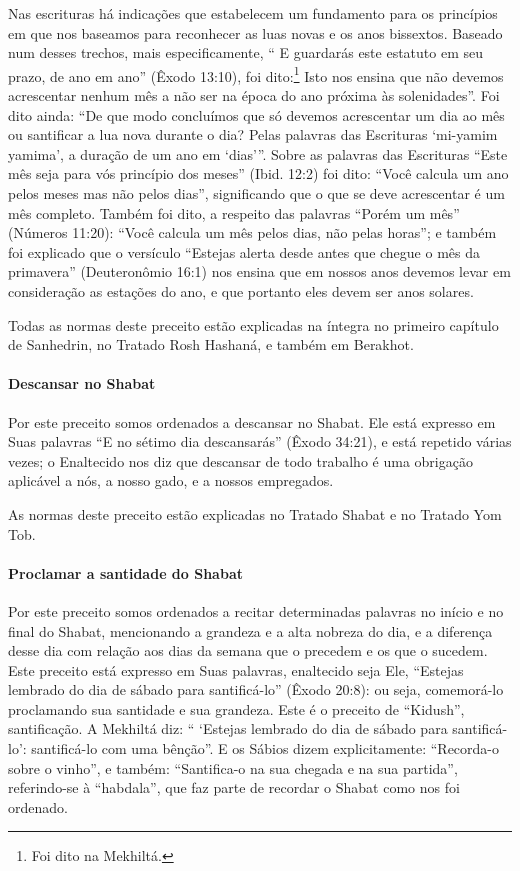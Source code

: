 Nas escrituras há indicações que estabelecem um fundamento para
os princípios em que nos baseamos para reconhecer as luas novas e os
anos bissextos. Baseado num desses trechos, mais especificamente, `` E
guardarás este estatuto em seu prazo, de ano em ano'' (Êxodo 13:10), foi
dito:\footnote{Foi dito na Mekhiltá.} Isto nos
ensina que não devemos acrescentar nenhum mês a não ser na época do ano
próxima às solenidades''. Foi dito ainda: ``De que modo concluímos que
só devemos acrescentar um dia ao mês ou santificar a lua nova durante o dia?
Pelas palavras das Escrituras `mi-yamim yamima', a duração de um ano em
`dias'''. Sobre as palavras das Escrituras ``Este mês seja para vós
princípio dos meses'' (Ibid. 12:2) foi dito: ``Você calcula um ano pelos
meses mas não pelos dias'', significando que o que se deve acrescentar é
um mês completo. Também foi dito, a respeito das palavras ``Porém um
mês'' (Números 11:20): ``Você calcula um mês pelos dias, não pelas
horas''; e também foi explicado que o versículo ``Estejas alerta desde
antes que chegue o mês da primavera'' (Deuteronômio 16:1) nos ensina que
em nossos anos devemos levar em consideração as estações do ano, e que
portanto eles devem ser anos solares.

Todas as normas deste preceito estão explicadas na íntegra no primeiro
capítulo de Sanhedrin, no Tratado Rosh Hashaná, e também em Berakhot.

\paragraph{Descansar no Shabat}

Por este preceito somos ordenados a descansar no Shabat. Ele está
expresso em Suas palavras ``E no sétimo dia descansarás'' (Êxodo 34:21),
e está repetido várias vezes; o Enaltecido nos diz que descansar de todo
trabalho é uma obrigação aplicável a nós, a nosso gado, e a nossos
empregados.

As normas deste preceito estão explicadas no Tratado Shabat e no Tratado
Yom Tob.

\paragraph{Proclamar a santidade do Shabat}

Por este preceito somos ordenados a recitar determinadas palavras no
início e no final do Shabat, mencionando a grandeza e a alta nobreza do
dia, e a diferença desse dia com relação aos dias da semana que o
precedem e os que o sucedem. Este preceito está expresso em Suas
palavras, enaltecido seja Ele, ``Estejas lembrado do dia de sábado para
santificá-lo'' (Êxodo 20:8): ou seja, comemorá-lo proclamando sua
santidade e sua grandeza. Este é o preceito de ``Kidush'',
santificação. A Mekhiltá diz: `` `Estejas lembrado do dia de sábado para
santificá-lo': santificá-lo com uma bênção''. E os Sábios dizem
explicitamente: ``Recorda-o sobre o vinho'', e também: ``Santifica-o na
sua chegada e na sua partida'', referindo-se à ``habdala'', que faz
parte de recordar o Shabat como nos foi ordenado.

